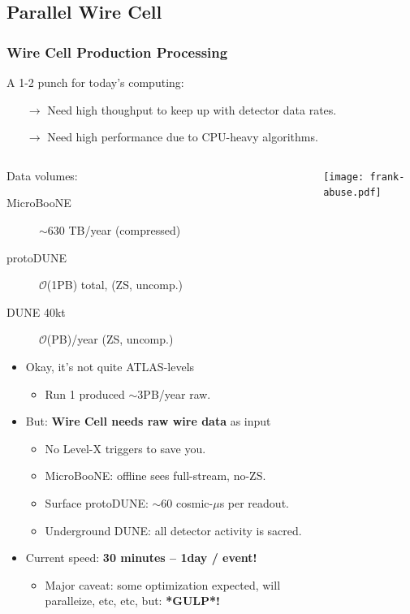 \documentclass[xcolor=dvipsnames]{beamer}
\begin{document}
\subsection{Parallel Wire Cell}

\begin{frame}
  \frametitle{Wire Cell Production Processing}

  A 1-2 punch for today's computing:
  \begin{itemize}\footnotesize
  \item[$\rightarrow$] Need high thoughput to keep up with detector data rates.
  \item[$\rightarrow$] Need high performance due to CPU-heavy algorithms.
  \end{itemize}

  \footnotesize

  \begin{columns}
    \begin{column}{0.70\textwidth}
      Data volumes:
      \begin{description}
      \item[MicroBooNE] $\sim$630 TB/year (compressed)
      \item[protoDUNE] $\mathcal{O}$(1PB) total, (ZS, uncomp.)
      \item[DUNE 40kt] $\mathcal{O}$(PB)/year (ZS, uncomp.)
      \end{description}
      \begin{itemize}
      \item Okay, it's not quite ATLAS-levels 
        \begin{itemize}\scriptsize
        \item Run 1 produced $\sim$3PB/year raw.
        \end{itemize}
      \item But: \textbf{Wire Cell needs raw wire data} as input
        \begin{itemize}\scriptsize
        \item No Level-X triggers to save you.
        \item MicroBooNE: offline sees full-stream, no-ZS.
        \item Surface protoDUNE: $\sim$60 cosmic-$\mu$s per readout.
        \item Underground DUNE: all detector activity is sacred.
        \end{itemize}
      \item Current speed: \textbf{30 minutes -- 1day / event!}
        \begin{itemize}\scriptsize
        \item Major caveat: some optimization expected, will
          paralleize, etc, etc, but: \textbf{*GULP*!}
        \end{itemize}
      \end{itemize}
    \end{column}
    \begin{column}{0.30\textwidth}
      \begin{center}
        \texttt{[image: frank-abuse.pdf]}


\end{center}
\end{column}
\end{columns}
\end{frame}
\end{document}
